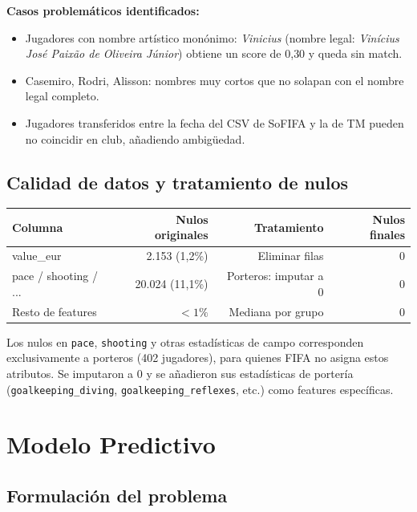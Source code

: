 \documentclass[12pt,a4paper]{report}
\begin{document}
\begin{warningbox}
\textbf{Casos problemáticos identificados:}
\begin{itemize}
  \item Jugadores con nombre artístico monónimo: \textit{Vinicius} (nombre legal: \textit{Vinícius José Paixão de Oliveira Júnior}) obtiene un score de 0{,}30 y queda sin match.
  \item Casemiro, Rodri, Alisson: nombres muy cortos que no solapan con el nombre legal completo.
  \item Jugadores transferidos entre la fecha del CSV de SoFIFA y la de TM pueden no coincidir en club, añadiendo ambigüedad.
\end{itemize}
\end{warningbox}

\section{Calidad de datos y tratamiento de nulos}

\begin{center}
\begin{tabular}{lrrr}
\toprule
\textbf{Columna} & \textbf{Nulos originales} & \textbf{Tratamiento} & \textbf{Nulos finales} \\
\midrule
value\_eur & 2.153 (1{,}2\%) & Eliminar filas & 0 \\
pace / shooting / ... & 20.024 (11{,}1\%) & Porteros: imputar a 0 & 0 \\
Resto de features & $< 1\%$ & Mediana por grupo & 0 \\
\bottomrule
\end{tabular}
\end{center}

Los nulos en \texttt{pace}, \texttt{shooting} y otras estadísticas de campo corresponden exclusivamente a porteros (402 jugadores), para quienes FIFA no asigna estos atributos. Se imputaron a 0 y se añadieron sus estadísticas de portería (\texttt{goalkeeping\_diving}, \texttt{goalkeeping\_reflexes}, etc.) como features específicas.


\chapter{Modelo Predictivo}

\section{Formulación del problema}
\end{document}
